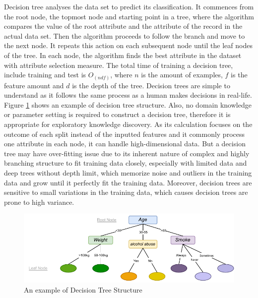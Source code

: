 \documentclass[12pt,a4paper,english
]{tunithesis}
\begin{document}
Decision tree analyses the data set to predict its classification. It commences from the root node, the topmost node and starting point in a tree, where the algorithm compares the value of the root attribute and the attribute of the record in the actual data set. Then the algorithm proceeds to follow the branch and move to the next node. It repeats this action on each subsequent node until the leaf nodes of the tree. In each node, the algorithm finds the best attribute in the dataset with attribute selection measure. The total time of training a decision tree, include training and test is ${O_{(ndf)}}$, where ${n}$ is the amount of examples, ${f}$ is the feature amount and ${d}$ is the depth of the tree. 
Decision trees are simple to understand as it follows the same process as a human makes decisions in real-life. Figure \ref{fig:decision_tree} shows an example of decision tree structure. Also, no domain knowledge or parameter setting is required to construct a decision tree, therefore it is appropriate for exploratory knowledge discovery. As its calculation focuses on the outcome of each split instead of the inputted features and it commonly process one attribute in each node, it can handle high-dimensional data. But a decision tree may have over-fitting issue due to its inherent nature of complex and highly branching structure to fit training data closely, especially with limited data and deep trees without depth limit, which memorize noise and outliers in the training data and grow until it perfectly fit the training data. Moreover, decision trees are sensitive to small variations in the training data, which causes decision trees are prone to high variance.

\begin{figure}
  \begin{center}
    \includegraphics[width=1\textwidth]{thesis/img/decision_tree.pdf}
  \end{center}
  \caption[Decision Tree]{An example of Decision Tree Structure}
  \label{fig:decision_tree}
\end{figure}
\end{document}
